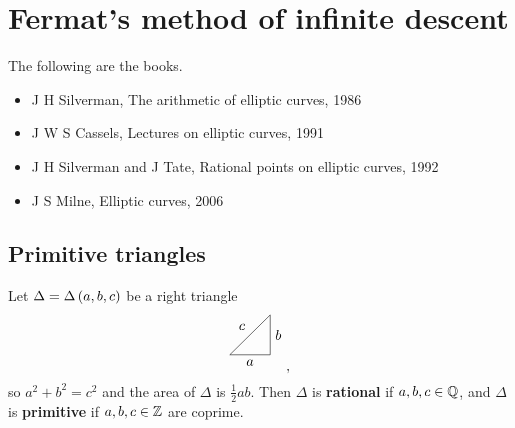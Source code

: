 \def\module{Elliptic Curves}
\def\lecturer{Prof Tom Fisher}
\def\term{Michaelmas 2020}
\def\cover{}
\def\syllabus{}
\def\thm{section}



\newcommand{\pp}{\mathfrak{P}}
\newcommand{\rational}[5][]{
  \ifx &#1&
    \begin{array}{rcl}
      #2 & \dashrightarrow & #3 \\
      #4 & \longmapsto     & #5
    \end{array}
  \else
    \begin{array}{ccrcl}
      #1 & : & #2 & \dashrightarrow & #3 \\
         &   & #4 & \longmapsto     & #5
    \end{array}
  \fi
}





\setcounter{section}{0}

\section{Fermat's method of infinite descent}


The following are the books.
\begin{itemize}
\item J H Silverman, The arithmetic of elliptic curves, 1986
\item J W S Cassels, Lectures on elliptic curves, 1991
\item J H Silverman and J Tate, Rational points on elliptic curves, 1992
\item J S Milne, Elliptic curves, 2006
\end{itemize}

\subsection{Primitive triangles}

\begin{definition*}
Let $ \Delta = \Delta\br{a, b, c} $ be a right triangle
$$
\begin{tikzpicture}
\draw (0, 0) to node[below]{$ a $} (-1, 0);
\draw (0, 0) to node[right]{$ b $} (0, 1);
\draw (-1, 0) to node[above left]{$ c $} (0, 1);
\end{tikzpicture},
$$
so $ a^2 + b^2 = c^2 $ and the area of $ \Delta $ is $ \tfrac{1}{2}ab $. Then $ \Delta $ is \textbf{rational} if $ a, b, c \in \mathbb{Q} $, and $ \Delta $ is \textbf{primitive} if $ a, b, c \in \mathbb{Z} $ are coprime.
\end{definition*}

